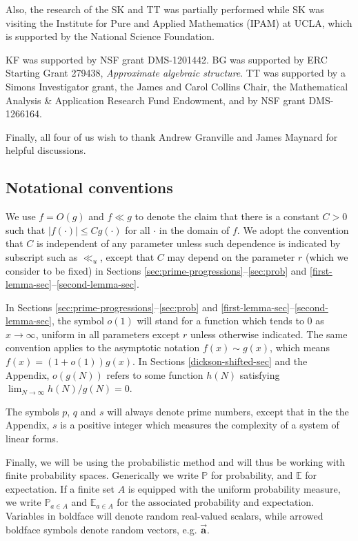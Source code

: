 \documentclass[11pt]{amsart}
\numberwithin{equation}{section}  %
\theoremstyle{remark}
\theoremstyle{plain}
\numberwithin{equation}{section}
\newcommand{\E}{\mathbb{E}}  %
\newcommand{\PR}{\mathbb{P}}  %
\newcommand{\Var}{\operatorname{Var}}  %
\renewcommand{\le}{\leqslant}
\renewcommand{\(}{\left(}
\renewcommand{\)}{\right)}
\newcommand{\asym}{\sim}   %
\newcommand{\rel}{\nsststile{}{}}  %
\newcommand{\vect}[1]{{\ensuremath{\vec{#1}}}}
\begin{document}
Also, the research of the SK and TT was partially
performed while SK was 
visiting the Institute for Pure and Applied Mathematics (IPAM) at UCLA,
which is supported by the National Science Foundation.

KF was supported by NSF grant DMS-1201442.
BG was supported by ERC Starting Grant 279438, \emph{Approximate algebraic structure}. 
TT was supported by a Simons Investigator grant, the
James and Carol Collins Chair, the Mathematical Analysis \&
Application Research Fund Endowment, and by NSF grant DMS-1266164. 

Finally, all four of us wish to thank Andrew Granville and James Maynard for helpful discussions.

\subsection{Notational conventions}\label{not-sec}
  
We use $f=O(g)$ and $f\ll g$ to denote the claim that there is a constant $C>0$ such that
$|f(\cdot)| \le C g(\cdot)$ for all $\cdot$ in the domain of $f$.
We adopt the convention that $C$ is independent of any parameter
unless such dependence is indicated by subscript such as  $\ll_u$,
except that $C$ may depend on the parameter $r$ (which we consider to
be fixed) in Sections
\ref{sec:prime-progressions}--\ref{sec:prob} and 
\ref{first-lemma-sec}--\ref{second-lemma-sec}.

In  Sections
\ref{sec:prime-progressions}--\ref{sec:prob} and
\ref{first-lemma-sec}--\ref{second-lemma-sec}, 
the symbol $o(1)$ will stand for a function which tends
to $0$ as $x\to\infty$, uniform in all parameters except $r$ unless 
otherwise indicated.
The same convention applies to the asymptotic
notation%
$f(x) \asym g(x)$, which means $f(x)=(1+o(1))g(x)$.
In Sections \ref{dickson-shifted-sec} and the Appendix, $o(g(N))$
refers to some function $h(N)$ satisfying $\lim_{N\to\infty} h(N)/g(N)=0$.

The symbols $p$, $q$ and $s$ will always denote prime numbers,
except that in the the Appendix,
$s$ is a positive integer which measures the complexity of a 
system of linear forms.

Finally, we will be using the probabilistic method and will thus be working with finite probability spaces.
Generically we write $\PR$ for probability, and $\E$ for expectation. %
If a finite set $A$ is equipped with the uniform probability measure,
we write $\PR_{a\in A}$ and $\E_{a\in A}$ for the associated probability and
expectation.  Variables in boldface will denote random real-valued scalars,
while arrowed boldface symbols denote random vectors, e.g.
$\vect{\mathbf{a}}$.
\end{document}
